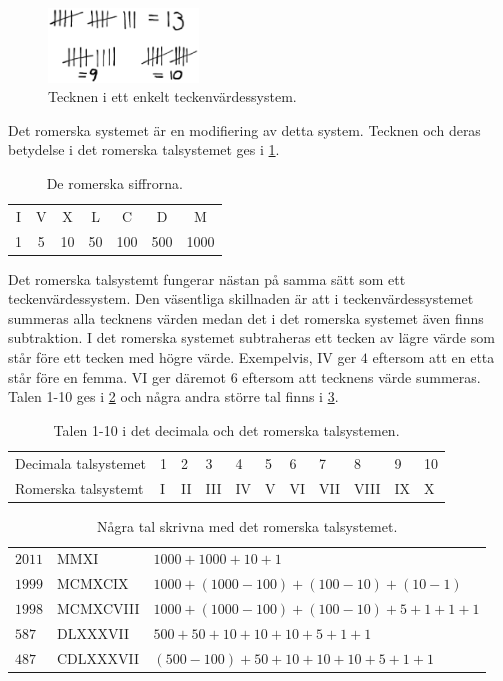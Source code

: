 \begin{figure}
  \includegraphics[width=4cm]{figs/strecktal.eps}
  \caption{%
    Tecknen i ett enkelt teckenvärdessystem.
  }\label{fig:Strecktal}
\end{figure}

Det romerska systemet är en modifiering av detta system.
Tecknen och deras betydelse i det romerska talsystemet ges i
\cref{tbl:RomerskaSiffror}.

\begin{table}
  \caption{%
    De romerska siffrorna.
  }\label{tbl:RomerskaSiffror}
  \begin{tabular}{ccccccc}
    \toprule
    I & V & X & L & C & D & M \\
    1 & 5 & 10 & 50 & 100 & 500 & 1000 \\
    \bottomrule
  \end{tabular}
\end{table}

Det romerska talsystemt fungerar nästan på samma sätt som ett
tecken\-värdes\-system.
Den väsentliga skillnaden är att i teckenvärdessystemet summeras alla tecknens
värden medan det i det romerska systemet även finns subtraktion.
I det romerska systemet subtraheras ett tecken av lägre värde som står före ett
tecken med högre värde.
Exempelvis, IV ger \(4\) eftersom att en etta står före en femma.
VI ger däremot \(6\) eftersom att tecknens värde summeras.
Talen 1-10 ges i \cref{tbl:RomerskaTal} och några andra större tal finns i
\cref{tbl:RomerskaTal2}.

\begin{table}
  \caption{%
    Talen 1-10 i det decimala och det romerska talsystemen.
  }\label{tbl:RomerskaTal}
  \begin{tabular}{lllllllllll}
    \toprule
    Decimala talsystemet & 1 & 2 & 3 & 4 & 5 & 6 & 7 & 8 & 9 & 10 \\
    Romerska talsystemt & I & II & III & IV & V &
      VI & VII & VIII & IX & X \\
    \bottomrule
  \end{tabular}
\end{table}

\begin{table}
  \caption{%
    Några tal skrivna med det romerska talsystemet.
  }\label{tbl:RomerskaTal2}
  \begin{tabular}{lll}
    \toprule
    \(2011\) & MMXI & \(1000+1000+10+1\) \\
    \(1999\) & MCMXCIX & \(1000+(1000-100)+(100-10)+(10-1)\) \\
    \(1998\) & MCMXCVIII & \(1000+(1000-100)+(100-10)+5+1+1+1\) \\
    \(587\) & DLXXXVII & \(500+50+10+10+10+5+1+1\) \\
    \(487\) & CDLXXXVII & \((500-100)+50+10+10+10+5+1+1\) \\
    \bottomrule
  \end{tabular}
\end{table}

